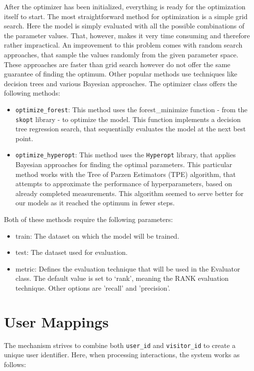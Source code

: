 After the optimizer has been initialized, everything is ready for the optimization itself to start. The most straightforward method for optimization is a simple grid search. Here the model is simply evaluated with all the possible combinations of the parameter values. That, however, makes it very time consuming and therefore rather impractical. An improvement to this problem comes with random search approaches, that sample the values randomly from the given parameter space. These approaches are faster than grid search however do not offer the same guarantee of finding the optimum. Other popular methods use techniques like decision trees and various Bayesian approaches. The optimizer class offers the following methods:
\begin{itemize}
    \item \texttt{optimize\_forest}: This method uses the forest\_minimize function - from the \texttt{skopt} library - to optimize the model. This function implements a decision tree regression search, that sequentially evaluates the model at the next best point. 
    
    \item \texttt{optimize\_hyperopt}: This method uses the \texttt{Hyperopt} library, that applies Bayesian approaches for finding the optimal parameters. This particular method works with the Tree of Parzen Estimators (TPE) algorithm, that attempts to approximate the performance of hyperparameters, based on already completed measurements. This algorithm seemed to serve better for our models as it reached the optimum in fewer steps.
\end{itemize}
Both of these methods require the following parameters:
\begin{itemize}
    \item train: The dataset on which the model will be trained.
    \item test: The dataset used for evaluation.
    \item metric: Defines the evaluation technique that will be used in the Evaluator class. The default value is set to ‘rank’, meaning the RANK evaluation technique. Other options are ’recall’ and ’precision’.
\end{itemize}



\section{User Mappings} \label{user_mappings}
The mechanism strives to combine both \texttt{user\_id} and \texttt{visitor\_id} to create a unique user identifier. Here, when processing interactions, the system works as follows:

